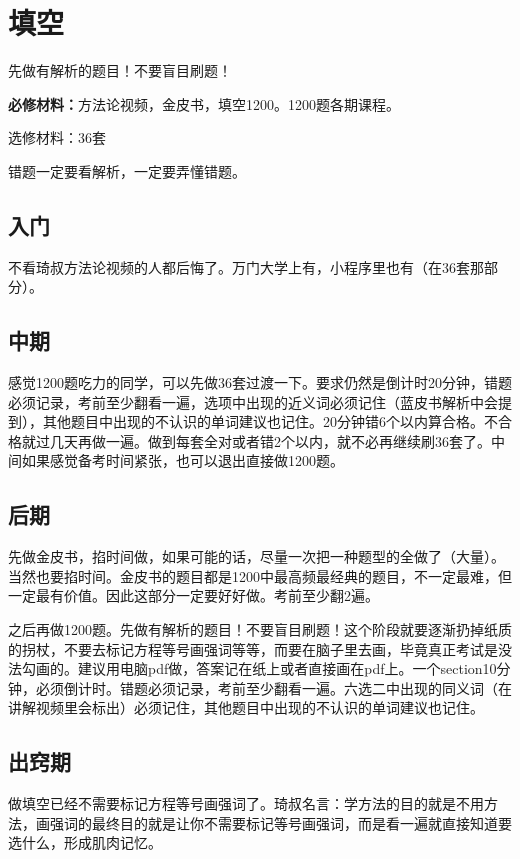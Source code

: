 \documentclass[cn,plain]{elegantbookex}
\newenvironment{material}{\begin{tcolorbox}[title={材料}]}{\end{tcolorbox}}
\begin{document}
\section{填空}
先做有解析的题目！不要盲目刷题！

\begin{material}
\textbf{必修材料：}方法论视频，金皮书，填空1200。1200题各期课程。

选修材料：36套
\end{material}

错题一定要看解析，一定要弄懂错题。

\subsection{入门}
不看琦叔方法论视频的人都后悔了。万门大学上有，小程序里也有（在36套那部分）。

\subsection{中期}
感觉1200题吃力的同学，可以先做36套过渡一下。要求仍然是倒计时20分钟，错题必须记录，考前至少翻看一遍，选项中出现的近义词必须记住（蓝皮书解析中会提到），其他题目中出现的不认识的单词建议也记住。20分钟错6个以内算合格。不合格就过几天再做一遍。做到每套全对或者错2个以内，就不必再继续刷36套了。中间如果感觉备考时间紧张，也可以退出直接做1200题。

\subsection{后期}
先做金皮书，掐时间做，如果可能的话，尽量一次把一种题型的全做了（大量）。当然也要掐时间。金皮书的题目都是1200中最高频最经典的题目，不一定最难，但一定最有价值。因此这部分一定要好好做。考前至少翻2遍。

之后再做1200题。先做有解析的题目！不要盲目刷题！这个阶段就要逐渐扔掉纸质的拐杖，不要去标记方程等号画强词等等，而要在脑子里去画，毕竟真正考试是没法勾画的。建议用电脑pdf做，答案记在纸上或者直接画在pdf上。一个section10分钟，必须倒计时。错题必须记录，考前至少翻看一遍。六选二中出现的同义词（在讲解视频里会标出）必须记住，其他题目中出现的不认识的单词建议也记住。

\subsection{出窍期}
做填空已经不需要标记方程等号画强词了。琦叔名言：学方法的目的就是不用方法，画强词的最终目的就是让你不需要标记等号画强词，而是看一遍就直接知道要选什么，形成肌肉记忆。
\end{document}
